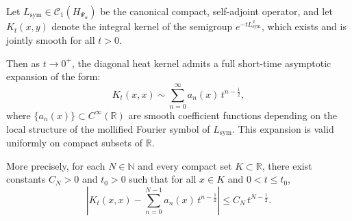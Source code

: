 \begin{lemma}
\label{lem:hk_expansion_uniform}
Let \( L_{\mathrm{sym}} \in \mathcal{C}_1(H_{\Psi_\alpha}) \) be the canonical compact, self-adjoint operator, and let \( K_t(x,y) \) denote the integral kernel of the semigroup \( e^{-t L_{\mathrm{sym}}^2} \), which exists and is jointly smooth for all \( t > 0 \).

Then as \( t \to 0^+ \), the diagonal heat kernel admits a full short-time asymptotic expansion of the form:
\[
K_t(x,x) \sim \sum_{n=0}^\infty a_n(x)\, t^{n - \frac{1}{2}},
\]
where \( \{ a_n(x) \} \subset C^\infty(\mathbb{R}) \) are smooth coefficient functions depending on the local structure of the mollified Fourier symbol of \( L_{\mathrm{sym}} \). This expansion is valid uniformly on compact subsets of \( \mathbb{R} \).

More precisely, for each \( N \in \mathbb{N} \) and every compact set \( K \subset \mathbb{R} \), there exist constants \( C_N > 0 \) and \( t_0 > 0 \) such that for all \( x \in K \) and \( 0 < t \le t_0 \),
\[
\left| K_t(x,x) - \sum_{n=0}^{N-1} a_n(x)\, t^{n - \frac{1}{2}} \right| \le C_N\, t^{N - \frac{1}{2}}.
\]
\end{lemma}
